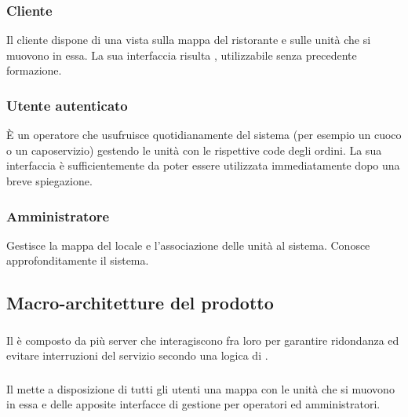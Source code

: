     \subsubsection{Cliente}
    Il cliente dispone di una vista sulla mappa del ristorante e sulle unità che si muovono in essa. La sua interfaccia risulta , utilizzabile senza precedente formazione.

    \subsubsection{Utente autenticato}
    È un operatore che usufruisce quotidianamente del sistema (per esempio un cuoco o un caposervizio) gestendo le unità con le rispettive code degli ordini. La sua interfaccia è sufficientemente  da poter essere utilizzata immediatamente dopo una breve spiegazione.

    \subsubsection{Amministratore}
    Gestisce la mappa del locale e l'associazione delle unità al sistema. Conosce approfonditamente il sistema.

\subsection{Macro-architetture del prodotto}
    \subsubsection{}
    Il  è composto da più server che interagiscono fra loro per garantire ridondanza ed evitare interruzioni del servizio secondo una logica di .

    \subsubsection{}
    Il  mette a disposizione di tutti gli utenti una mappa con le unità che si muovono in essa e delle apposite interfacce di gestione per operatori ed amministratori.
